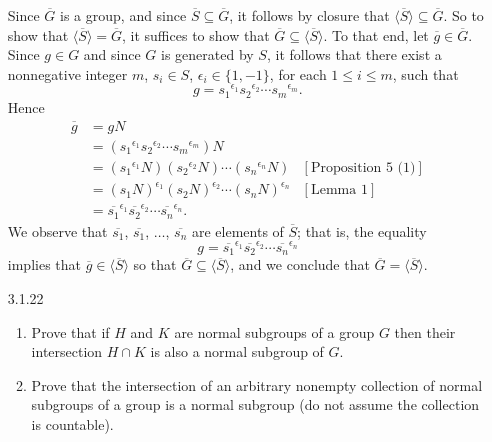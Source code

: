 \documentclass[9pt]{article}
\newcommand{\cyc}[1]{\langle #1 \rangle}
\begin{document}
\begin{enumerate}
      Since $\overline{G}$ is a group, and since
      $\overline{S} \subseteq \overline{G}$, it follows by closure that
      $\cyc{\overline{S}} \subseteq \overline{G}$. So to show that
      $\cyc{\overline{S}} = \overline{G}$, it suffices to show that
      $\overline{G} \subseteq \cyc{\overline{S}}$. To that end, let
      $\overline{g} \in \overline{G}$. Since $g \in G$ and since $G$ is
      generated by $S$, it follows that there exist a nonnegative integer
      $m$, $s_i \in S$, $\epsilon_i \in \{1, -1\}$, for each $1 \le i \le m$,
      such that
      $$g = {s_1}^{\epsilon_1}{s_2}^{\epsilon_2}\cdots{s_m}^{\epsilon_m}.$$
      Hence
      \begin{align*}
         \overline{g} &= gN \\
            &= ({s_1}^{\epsilon_1}{s_2}^{\epsilon_2}\cdots{s_m}^{\epsilon_m})N\\
            &= ({s_1}^{\epsilon_1}N)({s_2}^{\epsilon_2}N)\cdots
               ({s_n}^{\epsilon_n}N) &[\text{Proposition 5 (1)}] \\
            &= (s_1N)^{\epsilon_1}(s_2N)^{\epsilon_2}\cdots
               (s_nN)^{\epsilon_n} &[\text{Lemma 1}] \\
            &= \overline{s_1}^{\epsilon_1}\overline{s_2}^{\epsilon_2}\cdots
               \overline{s_n}^{\epsilon_n}.
      \end{align*}
      We observe that $\overline{s_1}$, $\overline{s_1}$, $\ldots$,
      $\overline{s_n}$ are elements of $\overline{S}$; that is, the equality
      $$g = \overline{s_1}^{\epsilon_1}\overline{s_2}^{\epsilon_2}\cdots
        \overline{s_n}^{\epsilon_n}$$
      implies that $\overline{g} \in \cyc{\overline{S}}$ so that
      $\overline{G} \subseteq \cyc{\overline{S}}$, and we conclude that
      $\overline{G} = \cyc{\overline{S}}$.
      
   \item[3.1.22]  \begin{enumerate}
                     \item Prove that if $H$ and $K$ are normal subgroups of a
                           group $G$ then their intersection $H \cap K$ is also
                           a normal subgroup of $G$.
                     \item Prove that the intersection of an arbitrary nonempty
                           collection of normal subgroups of a group is a normal
                           subgroup (do not assume the collection is countable).
                  \end{enumerate}
                  

\end{enumerate}
\end{document}

